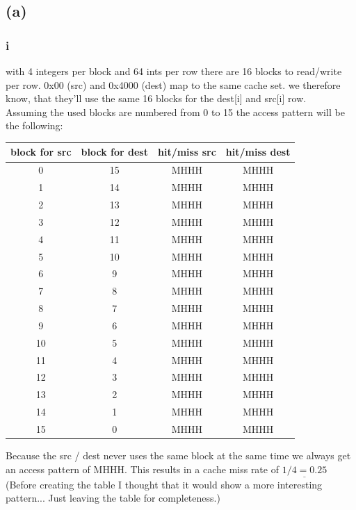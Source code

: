\documentclass[10pt,a4paper,oneside,notitlepage]{report}
\begin{document}
\subsection*{(a)}
\subsubsection*{i}
with 4 integers per block and 64 ints per row there are 16 blocks to read/write per row. 0x00 (src) and 0x4000 (dest) map to the same cache set. we therefore know, that they'll use the same 16 blocks for the dest[i] and src[i] row.  \\ Assuming the used blocks are numbered from 0 to 15 the access pattern will be the following: \\

\begin{tabular}{|c|c|c|c|}
\hline 
\rowcolor{gray!30}
\textbf{block for src} &\textbf{ block for dest} & \textbf{hit/miss src} & \textbf{hit/miss dest} \\ 
\hline 
0 & 15 & MHHH & MHHH \\ 
\hline 
1 & 14 & MHHH & MHHH \\ 
\hline 
2 & 13 & MHHH & MHHH \\ 
\hline 
3 & 12 & MHHH & MHHH \\ 
\hline 
4 & 11 & MHHH & MHHH \\ 
\hline 
5 & 10 & MHHH & MHHH \\ 
\hline 
6 & 9 & MHHH & MHHH \\ 
\hline 
7 & 8 & MHHH & MHHH \\ 
\hline 
8 & 7 & MHHH & MHHH \\ 
\hline 
9 & 6 & MHHH & MHHH \\ 
\hline 
10 & 5 & MHHH & MHHH \\ 
\hline 
11 & 4 & MHHH & MHHH \\ 
\hline 
12 & 3 & MHHH & MHHH \\ 
\hline 
13 & 2 & MHHH & MHHH \\ 
\hline 
14 & 1 & MHHH & MHHH \\ 
\hline 
15 & 0 & MHHH & MHHH \\ 
\hline 
\end{tabular} 

Because the src / dest never uses the same block at the same time we always get an access pattern of MHHH. This results in a cache miss rate of $\underline{1/4=0.25}$\\
(Before creating the table I thought that it would show a more interesting pattern... Just leaving the table for completeness.)
\end{document}
